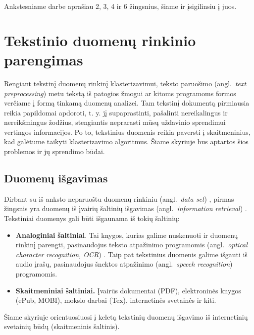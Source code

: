 \documentclass{VUMIFInfKursinis}
\newcommand{\ltang}[2]{#1 (angl.\  \textit{#2}) }
\begin{document}
Ankstesniame darbe aprašiau 2, 3, 4 ir 6 žingsnius, šiame ir
įsigilinsiu į juos.










\section{Tekstinio duomenų rinkinio parengimas}

Rengiant tekstinį duomenų rinkinį klasterizavimui, 
\ltang{teksto paruošimo}{text preprocessing} metu tekstą iš patogios žmogui ar
kitoms programoms formos verčiame į formą tinkamą duomenų analizei. Tam
tekstinį dokumentą pirmiausia reikia papildomai apdoroti, t. y. jį
supaprastinti, pašalinti nereikalingus ir nereikšmingus žodžius,
stengiantis neprarasti mūsų uždavinio sprendimui vertingos informacijos.
Po to, tekstinius duomenis reikia paversti į skaitmeninius, kad galėtume
taikyti klasterizavimo algoritmus. Šiame skyriuje bus aptartos šios
problemos ir jų sprendimo būdai.





\subsection{Duomenų išgavimas}

Dirbant su iš anksto neparuoštu \ltang{duomenų rinkiniu}{data
set}, pirmas žingsnis yra 
\ltang{duomenų iš įvairių šaltinių išgavimas}{information retrieval} \cite{kadhim2014text}. Tekstiniai duomenys
gali būti išgaunama iš tokių šaltinių:

\begin{itemize}
\item
  \textbf{Analoginiai} \textbf{šaltiniai}. Tai knygos, kurias galime
  nuskenuoti ir duomenų rinkinį parengti, pasinaudojus \ltang{teksto atpažinimo
  programomis}{optical character recognition, OCR}. Taip
  pat tekstinius duomenis galime išgauti iš audio įrašų, pasinaudojus
  \ltang{šnektos atpažinimo}{speech recognition} programomis.
\item
  \textbf{Skaitmeniniai} \textbf{šaltiniai.} Įvairūs dokumentai (PDF),
  elektroninės knygos (ePub, MOBI), mokslo darbai (Tex), internetinės
  svetainės ir kiti. 
\end{itemize}

Šiame skyriuje orientuosiuosi į keletą tekstinių duomenų išgavimo iš
internetinių svetainių būdų (skaitmeninis šaltinis).
\end{document}
